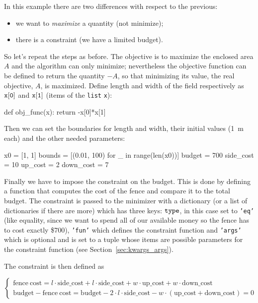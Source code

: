 In this example there are two differences with respect to the previous:

\begin{itemize}
\tightlist
\item
  we want to \emph{maximize} a quantity (not minimize);
\item
  there is a constraint (we have a limited budget).
\end{itemize}

So let's repeat the steps as before. The objective is to maximize the
enclosed area \(A\) and the algorithm can only minimize; nevertheless the objective function can be defined 
to return the quantity \(-A\), so that minimizing its value, the real objective, $A$, is maximized. 
Define length and width of the field respectively as \(\tt{x[0]}\) and \(\tt{x[1]}\) (items of the \texttt{list} \texttt{x}):

\begin{ipython}
def obj_func(x):
    return -x[0]*x[1]
\end{ipython}
Then we can set the boundaries for length and width, their initial values (1~m each) and the other needed parameters:

\begin{ipython}
x0 = [1, 1]
bounds = [(0.01, 100) for _ in range(len(x0))]
budget = 700
side_cost = 10
up_cost = 2
down_cost = 7

\end{ipython}

Finally we have to impose the constraint on the budget. This is done by
defining a function that computes the cost of the fence and
compare it to the total budget. 
The constraint is passed to the minimizer with a dictionary (or a list 
of dictionaries if there are more) which has three keys: 
\(\tt{type}\), in this case set to \texttt{'eq'}
(like equality, since we want to spend all of our available money so the
fence has to cost exactly \$700), \texttt{'fun'} which defines the constraint 
function and \texttt{'args'} which is optional and is set to a tuple 
whose items are possible parameters for the constraint function (see Section~\ref{sec:kwargs_args}).

The constraint is then defined as

\begin{equation*}
\begin{cases}
\mathrm{fence~cost} = l\cdot\mathrm{side\_cost} + l\cdot\mathrm{side\_cost} + w\cdot\mathrm{up\_cost} + w\cdot\mathrm{down\_cost}\\
\mathrm{budget} - \mathrm{fence~cost} = \mathrm{budget} - 2\cdot l\cdot\mathrm{side\_cost} - w\cdot(\mathrm{up\_cost} + \mathrm{down\_cost}) = 0
\end{cases}
\end{equation*}

